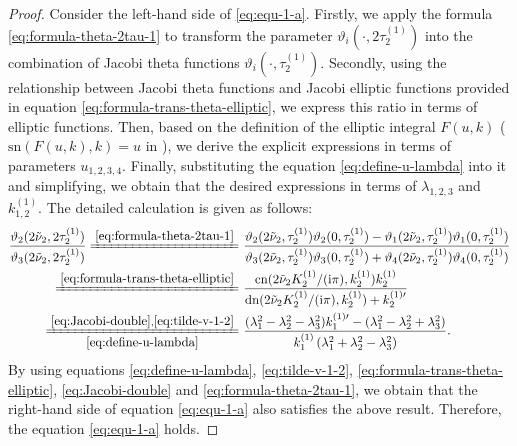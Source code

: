 \documentclass[11pt,reqno]{amsart}
\newcommand{\ii}{\mathrm{i}}
\newcommand{\sn}{\mathrm{sn}}
\newcommand{\cn}{\mathrm{cn}}
\newcommand{\dn}{\mathrm{dn}}
\numberwithin{equation}{section}
\begin{document}
\begin{proof}
		Consider the left-hand side of \eqref{eq:equ-1-a}.
		Firstly, we apply the formula \eqref{eq:formula-theta-2tau-1} to transform the parameter $\vartheta_i(\cdot,2  \tau^{(1)}_2)$ into the combination of Jacobi theta functions $\vartheta_i( \cdot,\tau^{(1)}_2)$. 
		Secondly, using the relationship between Jacobi theta functions and Jacobi elliptic functions provided in equation \eqref{eq:formula-trans-theta-elliptic}, we express this ratio in terms of elliptic functions.
		Then, based on the definition of the elliptic integral $F(u,k)$ ($\sn(F(u,k),k)=u$ in ), we derive the explicit expressions in terms of parameters $u_{1,2,3,4}$.
		Finally, substituting the equation \eqref{eq:define-u-lambda} into it and simplifying, we obtain that the desired expressions in terms of $\lambda_{1,2,3}$ and $  k^{(1)}_{1,2}$.
		The detailed calculation is given as follows:
		\begin{equation}\nonumber
			\begin{split}
				\frac{\vartheta_2(2\tilde{\nu}_2,2  \tau^{(1)}_2)}{\vartheta_3(2\tilde{\nu}_2,2  \tau^{(1)}_2)}
				\xlongequal{\eqref{eq:formula-theta-2tau-1}}& \ 
				\frac{\vartheta_2(2\tilde{\nu}_2,  \tau^{(1)}_2)\vartheta_2(0,  \tau^{(1)}_2)-\vartheta_1(2\tilde{\nu}_2,  \tau^{(1)}_2)\vartheta_1(0,  \tau^{(1)}_2)}{\vartheta_3(2\tilde{\nu}_2,  \tau^{(1)}_2)\vartheta_3(0,  \tau^{(1)}_2)+\vartheta_4(2\tilde{\nu}_2,  \tau^{(1)}_2)\vartheta_4(0,  \tau^{(1)}_2)}\\
				\xlongequal{\eqref{eq:formula-trans-theta-elliptic}}&\
				\frac{\cn(2\tilde{\nu}_2  K^{(1)}_2/(\ii\pi),  k^{(1)}_2)  k^{(1)}_2}{\dn(2\tilde{\nu}_2  K^{(1)}_2/(\ii\pi),  k^{(1)}_2)+  k^{(1)\prime}_2}\\
				\xlongequal[\eqref{eq:define-u-lambda}]{\eqref{eq:Jacobi-double},\eqref{eq:tilde-v-1-2}} & \ 
				\frac{(\lambda_{1}^{2}-\lambda_{2}^{2}-\lambda_{3}^{2}) k^{(1)\prime}_1-(\lambda_{1}^{2}-\lambda_{2}^{2}+\lambda_{3}^{2})}{  k^{(1)}_1 \left(\lambda_{1}^{2}+\lambda_{2}^{2}-\lambda_{3}^{2}\right)}.
			\end{split}
		\end{equation}
		By using equations \eqref{eq:define-u-lambda}, \eqref{eq:tilde-v-1-2}, \eqref{eq:formula-trans-theta-elliptic}, \eqref{eq:Jacobi-double} and \eqref{eq:formula-theta-2tau-1}, we obtain that the right-hand side of equation \eqref{eq:equ-1-a} also satisfies the above result.
		Therefore, the equation \eqref{eq:equ-1-a} holds.
		

\end{proof}
\end{document}
